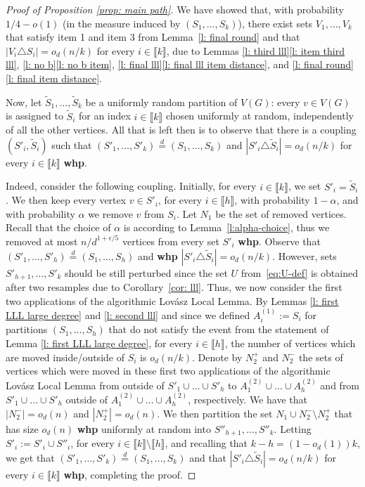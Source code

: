 \documentclass[notitlepage]{scrartcl}
\newcommand{\br}[1]{\llbracket{#1}\rrbracket}
\begin{document}
\begin{proof}[Proof of Proposition \ref{prop: main path}]
We have showed that, with probability $1/4-o(1)$ (in the measure induced by $(S_1,\ldots,S_k)$), there exist sets $V_1,\ldots,V_k$ that satisfy item 1 and item 3 from Lemma~\ref{l: final round} and that $|V_i\triangle S_i|=o_d(n/k)$ for every $i\in \br{k}$, due to Lemmas \ref{l: third lll}\eqref{l: item third lll}, \ref{l: no b}\eqref{l: no b item}, \ref{l: final lll}\eqref{l: final lll item distance}, and \ref{l: final round}\eqref{l: final item distance}. 

Now, let $\tilde{S}_1,\ldots, \tilde{S}_k$ be a uniformly random partition of $V(G)$: every $v\in V(G)$ is assigned to $\tilde{S}_i$ for an index $i\in \br{k}$ chosen uniformly at random, independently of all the other vertices. All that is left then is to observe that there is a coupling $(S'_i,\tilde S_i)$  such that $(S'_1,\ldots,S'_k)\stackrel{d}=(S_1,\ldots,S_k)$ and  $|S'_i\triangle \tilde{S}_i|=o_d(n/k)$ for every $i\in \br{k}$ \textbf{whp}. 


Indeed, consider the following coupling. Initially, for every $i\in \br{k}$, we set $S'_i=\tilde{S}_i$. We then keep every vertex $v\in S'_i$, for every $i\in \br{h}$, with probability $1-\alpha$, and with probability $\alpha$ we remove $v$ from $S_i$. Let $N_1$ be the set of removed vertices. Recall that the choice of $\alpha$ is according to Lemma~\ref{l:alpha-choice}, thus we removed at most $n/d^{1+\epsilon/5}$ vertices from every set $S'_i$ \textbf{whp}. Observe that $(S'_1,\ldots,S'_h)\stackrel{d}=(S_1,\ldots,S_h)$ and \textbf{whp} $|S'_i\triangle \tilde{S}_i|=o_d(n/k)$. However, sets $S'_{h+1},\ldots,S'_k$ should be still perturbed since the set $U$ from~\eqref{eq:U-def} is obtained after two resamples due to Corollary~\ref{cor: lll}. Thus, we now consider the first two applications of the algorithmic Lov\'asz Local Lemma. By Lemmas \ref{l: first LLL large degree} and \ref{l: second lll} and since we defined $A_i^{(1)}:=S_i$ for partitions $(S_1,\ldots,S_h)$ that do not satisfy the event from the statement of Lemma \ref{l: first LLL large degree}, for every $i \in \br{h}$, the number of vertices which are moved inside/outside of $S_i$ is $o_d(n/k)$. Denote by $N^{+}_2$ and $N_2^-$ the sets of vertices which were moved in these first two applications of the algorithmic Lov\'asz Local Lemma from outside of $S'_1\cup\ldots\cup S'_h$ to $A_1^{(2)}\cup\ldots\cup A_h^{(2)}$ and from $S'_1\cup\ldots\cup S'_h$ outside of $A_1^{(2)}\cup\ldots\cup A_h^{(2)}$, respectively. We have that $|N_2^-|=o_d(n)$ and $|N_2^+|=o_d(n)$. We then partition the set $N_1\cup N_2^-\setminus N_2^+$ that has size $o_d(n)$ \textbf{whp} uniformly at random into $S''_{h+1},\ldots,S''_k$. Letting $S'_i:=S'_i\cup S''_i$, for every $i\in\br{k}\setminus\br{h}$, and recalling that $k-h=(1-o_d(1))k$, we get that $(S'_1,\ldots,S'_k)\stackrel{d}=(S_1,\ldots,S_k)$ and that $|S'_i\triangle \tilde{S}_i|=o_d(n/k)$ for every $i\in \br{k}$ \textbf{whp}, completing the proof.
\end{proof}
\end{document}
